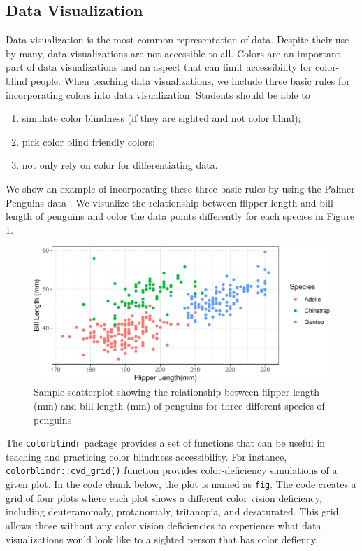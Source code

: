 \documentclass[12pt]{article}
\providecommand{\tightlist}{%
  \setlength{\itemsep}{0pt}\setlength{\parskip}{0pt}}
\begin{document}
\hypertarget{data-visualization}{%
\subsection{Data Visualization}\label{data-visualization}}

Data visualization is the most common representation of data. Despite their use by many, data visualizations are not accessible to all.
Colors are an important part of data visualizations and an aspect that can limit accessibility for color-blind people.
When teaching data visualizations, we include three basic rules for incorporating colors into data visualization. Students should be able to

\begin{enumerate}
\def\labelenumi{\arabic{enumi}.}
\tightlist
\item
  simulate color blindness (if they are sighted and not color blind);
\item
  pick color blind friendly colors;
\item
  not only rely on color for differentiating data.
\end{enumerate}

We show an example of incorporating these three basic rules by using the Palmer Penguins data \citep{R-palmerpenguins}.
We visualize the relationship between flipper length and bill length of penguins and color the data points differently for each species in Figure \ref{fig:penguins-basic}.

\begin{figure}
\includegraphics{figure/penguins-basic-1} \caption{Sample scatterplot showing the relationship between flipper length (mm) and bill length (mm) of penguins for three different species of penguins}\label{fig:penguins-basic}
\end{figure}

The \texttt{colorblindr} package \citep{R-colorblindr} provides a set of functions that can be useful in teaching and practicing color blindness accessibility.
For instance, \texttt{colorblindr::cvd\_grid()} function provides color-deficiency simulations of a given plot.
In the code chunk below, the plot is named as \texttt{fig}.
The code creates a grid of four plots where each plot shows a different color vision deficiency, including deuteranomaly, protanomaly, tritanopia, and desaturated.
This grid allows those without any color vision deficiencies to experience what data visualizations would look like to a sighted person that has color defiency.
\end{document}
